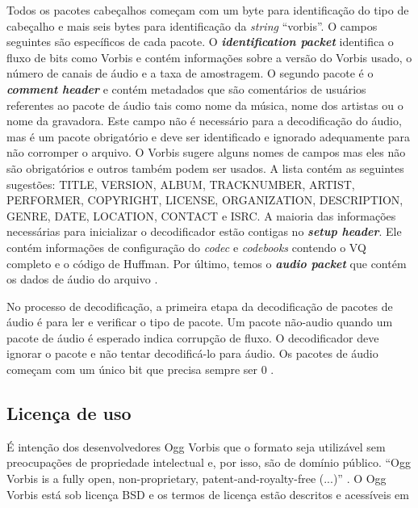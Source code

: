 Todos os pacotes cabeçalhos começam com um byte para identificação do tipo de cabeçalho e mais seis bytes para identificação da \textit{string} ``vorbis''. O campos seguintes são específicos de cada pacote. O \textbf{\textit{identification packet}} identifica o fluxo de bits como Vorbis e contém informações sobre a versão do Vorbis usado, o número de canais de áudio e a taxa de amostragem. O segundo pacote é o \textbf{\textit{comment header}} e contém metadados que são comentários de usuários referentes ao pacote de áudio tais como nome da música, nome dos artistas ou o nome da gravadora. Este campo não é necessário para a decodificação do áudio, mas é um pacote obrigatório e deve ser identificado e ignorado adequamente para não corromper o arquivo. O Vorbis sugere alguns nomes de campos mas eles não são obrigatórios e outros também podem ser usados. A lista contém as seguintes sugestões: TITLE, VERSION, ALBUM, TRACKNUMBER, ARTIST, PERFORMER, COPYRIGHT, LICENSE, ORGANIZATION, DESCRIPTION, GENRE, DATE, LOCATION, CONTACT e ISRC. A maioria das informações necessárias para inicializar o decodificador estão contigas no \textit{\textbf{setup header}}. Ele contém informações de configuração do \textit{codec} e \textit{codebooks} contendo o VQ completo e o código de Huffman. Por último, temos o \textbf{\textit{audio packet}} que contém os dados de áudio do arquivo \cite{vorbis}.

No processo de decodificação, a primeira etapa da decodificação de pacotes de áudio é para ler e verificar o tipo de pacote. Um pacote não-audio quando um pacote de áudio é esperado indica corrupção de fluxo. O decodificador deve ignorar o pacote e não tentar decodificá-lo para áudio. Os pacotes de áudio começam com um único bit que precisa sempre ser 0 \cite{vorbis}.


\subsection{Licença de uso}

É intenção dos desenvolvedores Ogg Vorbis que o formato seja utilizável sem preocupações de propriedade intelectual e, por isso, são de domínio público. ``Ogg Vorbis is a fully open, non-proprietary, patent-and-royalty-free (...)'' \cite{license}. O Ogg Vorbis está sob licença BSD e os termos de licença estão descritos e acessíveis em \cite{licenseterms}